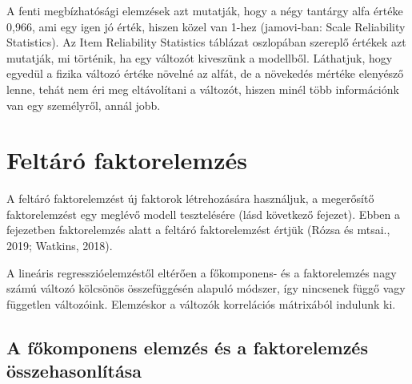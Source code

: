 \documentclass[
  letterpaper,
]{krantz}
\begin{document}
A fenti megbízhatósági elemzések azt mutatják, hogy a négy tantárgy alfa
értéke 0,966, ami egy igen jó érték, hiszen közel van 1-hez (jamovi-ban:
Scale Reliability Statistics). Az Item Reliability Statistics táblázat
oszlopában szereplő értékek azt mutatják, mi történik, ha egy változót
kiveszünk a modellből. Láthatjuk, hogy egyedül a fizika változó értéke
növelné az alfát, de a növekedés mértéke elenyésző lenne, tehát nem éri
meg eltávolítani a változót, hiszen minél több információnk van egy
személyről, annál jobb.


\hypertarget{sec-feltaro-faktorelemzes}{%
\chapter{Feltáró faktorelemzés}\label{sec-feltaro-faktorelemzes}}

A feltáró faktorelemzést új faktorok létrehozására használjuk, a
megerősítő faktorelemzést egy meglévő modell tesztelésére (lásd
következő fejezet). Ebben a fejezetben faktorelemzés alatt a feltáró
faktorelemzést értjük (Rózsa és mtsai., 2019; Watkins, 2018).

A lineáris regresszióelemzéstől eltérően a főkomponens- és a
faktorelemzés nagy számú változó kölcsönös összefüggésén alapuló
módszer, így nincsenek függő vagy független változóink. Elemzéskor a
változók korrelációs mátrixából indulunk ki.

\hypertarget{a-fux151komponens-elemzuxe9s-uxe9s-a-faktorelemzuxe9s-uxf6sszehasonluxedtuxe1sa}{%
\section{A főkomponens elemzés és a faktorelemzés
összehasonlítása}\label{a-fux151komponens-elemzuxe9s-uxe9s-a-faktorelemzuxe9s-uxf6sszehasonluxedtuxe1sa}}
\end{document}
